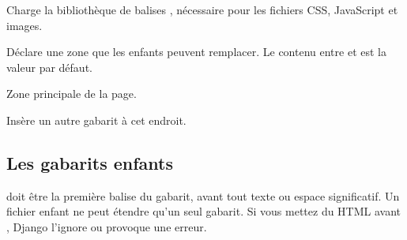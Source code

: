 \begin{description}[leftmargin=3.1cm,style=nextline]
  \item[\code{\{\% load static \%\}}] Charge la bibliothèque de balises
  , nécessaire pour les fichiers CSS, JavaScript et images.
  \item[\code{\{\% block titre \%\}}] Déclare une zone que les enfants peuvent
  remplacer. Le contenu entre  et  est la valeur par
  défaut.
  \item[\code{\{\% block contenu \%\}}] Zone principale de la page.
  \item[\code{\{\% include \%\}}] Insère un autre gabarit à cet endroit.
\end{description}

\subsection{Les gabarits enfants}



\begin{attention}
 doit être la première balise du gabarit, avant tout texte
ou espace significatif. Un fichier enfant ne peut étendre qu'un seul gabarit. Si
vous mettez du HTML avant , Django l'ignore ou provoque une erreur.
\end{attention}

